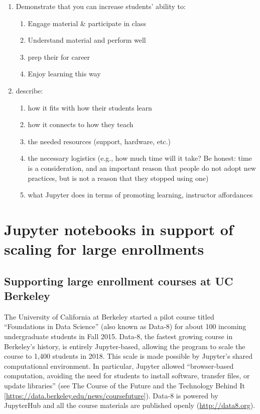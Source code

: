 \documentclass[]{book}
\providecommand{\tightlist}{%
  \setlength{\itemsep}{0pt}\setlength{\parskip}{0pt}}
\begin{document}
\begin{enumerate}
\def\labelenumi{\arabic{enumi}.}
\tightlist
\item
  Demonstrate that you can increase students' ability to:

  \begin{enumerate}
  \def\labelenumii{\arabic{enumii}.}
  \tightlist
  \item
    Engage material \& participate in class
  \item
    Understand material and perform well
  \item
    prep their for career
  \item
    Enjoy learning this way
  \end{enumerate}
\item
  describe:

  \begin{enumerate}
  \def\labelenumii{\arabic{enumii}.}
  \tightlist
  \item
    how it fits with how their students learn
  \item
    how it connects to how they teach
  \item
    the needed resources (support, hardware, etc.)
  \item
    the necessary logistics (e.g., how much time will it take? Be
    honest: time is a consideration, and an important reason that people
    do not adopt new practices, but is not a reason that they stopped
    using one)
  \item
    what Jupyter does in terms of promoting learning, instructor
    affordances
  \end{enumerate}
\end{enumerate}

\section{Jupyter notebooks in support of scaling for large
enrollments}\label{jupyter-notebooks-in-support-of-scaling-for-large-enrollments}

\subsection{Supporting large enrollment courses at UC
Berkeley}\label{supporting-large-enrollment-courses-at-uc-berkeley}

The University of California at Berkeley started a pilot course titled
``Foundations in Data Science'' (also known as Data-8) for about 100
incoming undergraduate students in Fall 2015. Data-8, the fastest
growing course in Berkeley's history, is entirely Jupyter-based,
allowing the program to scale the course to 1,400 students in 2018. This
scale is made possible by Jupyter's shared computational environment. In
particular, Jupyter allowed ``browser-based computation, avoiding the
need for students to install software, transfer files, or update
libraries'' (see The Course of the Future and the Technology Behind It
{[}\url{https://data.berkeley.edu/news/coursefuture}{]}). Data-8 is
powered by JupyterHub and all the course materials are published openly
(\url{http://data8.org}).
\end{document}
